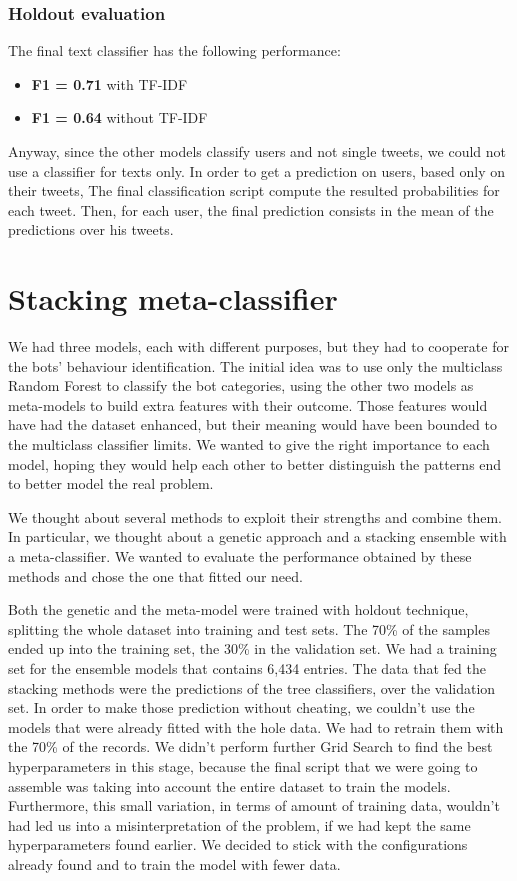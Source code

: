 \subsubsection{Holdout evaluation}
The final text classifier has the following performance:
\begin{itemize}
	\item[\PencilRight] \textbf{F1 = 0.71} with TF-IDF
	\item[\PencilRight] \textbf{F1 = 0.64} without TF-IDF
\end{itemize}

Anyway, since the other models classify users and not single tweets, we could not use a classifier for texts only.
In order to get a prediction on users, based only on their tweets, The final classification script compute the resulted probabilities for each tweet. Then, for each user, the final prediction consists in the mean of the predictions over his tweets.


\section{Stacking meta-classifier}
We had three models, each with different purposes, but they had to cooperate for the bots' behaviour identification.
The initial idea was to use only the multiclass Random Forest to classify the bot categories, using the other two models as meta-models to build extra features with their outcome.
Those features would have had the dataset enhanced, but their meaning would have been bounded to the multiclass classifier limits.
We wanted to give the right importance to each model, hoping they would help each other to better distinguish the patterns end to better model the real problem.

We thought about several methods to exploit their strengths and combine them. In particular, we thought about a genetic approach and a stacking ensemble with a meta-classifier. 
We wanted to evaluate the performance obtained by these methods and chose the one that fitted our need.

Both the genetic and the meta-model were trained with holdout technique, splitting the whole dataset into training and test sets. The 70\% of the samples ended up into the training set, the 30\% in the validation set.
We had a training set for the ensemble models that contains 6,434 entries.
The data that fed the stacking methods were the predictions of the tree classifiers, over the validation set.
In order to make those prediction without cheating, we couldn't use the models that were already fitted with the hole data. We had to retrain them with the 70\% of the records. 
We didn't perform further Grid Search to find the best hyperparameters in this stage, because the final script that we were going to assemble was taking into account the entire dataset to train the models. Furthermore, this small variation, in terms of amount of training data, wouldn't had led us into a misinterpretation of the problem, if we had kept the same hyperparameters found earlier.
We decided to stick with the configurations already found and to train the model with fewer data.

